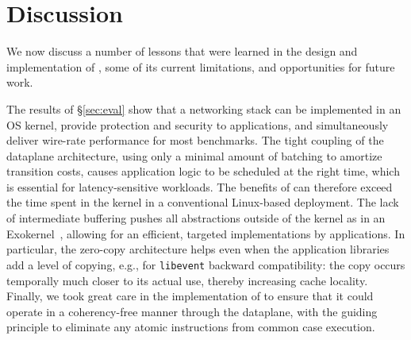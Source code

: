 
\section{Discussion}
\label{sec:disc}

We now discuss a number of lessons that were learned in the design and
implementation of \ix, some of its current limitations, and
opportunities for future work.

 The results of \S\ref{sec:eval}
show that a networking stack can be implemented in an OS kernel,
provide protection and security to applications, and simultaneously
deliver wire-rate performance for most benchmarks.  The tight coupling
of the dataplane architecture, using only a minimal amount of batching
to amortize transition costs, causes application logic to be scheduled
at the right time, which is essential for latency-sensitive workloads.
The benefits of \ix can therefore exceed the time spent in the kernel
in a conventional Linux-based deployment.  The lack of intermediate
buffering pushes all abstractions outside of the kernel as in an
Exokernel~\cite{DBLP:conf/sosp/EnglerKO95}, allowing for an efficient,
targeted implementations by applications.  In particular, the
zero-copy architecture helps even when the application libraries add a
level of copying, e.g., for \texttt{libevent} backward compatibility:
the copy occurs temporally much closer to its actual use, thereby
increasing cache locality.  Finally, we took great care in the
implementation of \ix to ensure that it could operate in a
coherency-free manner through the dataplane, with the guiding
principle to eliminate any atomic instructions from common case
execution.




